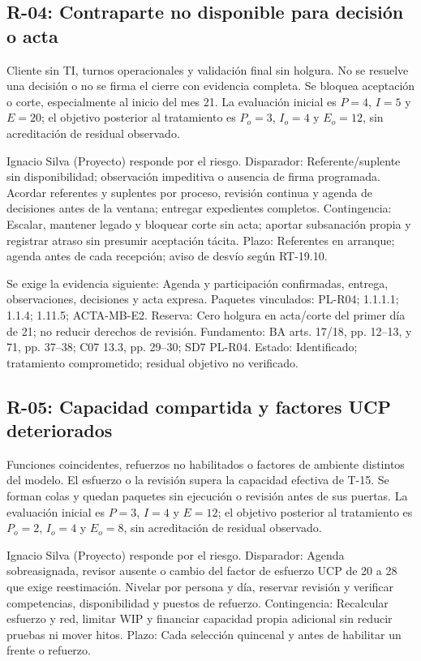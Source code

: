 \subsection{R-04: Contraparte no disponible para decisión o acta}
Cliente sin TI, turnos operacionales y validación final sin holgura. No se resuelve una decisión o no se firma el cierre con evidencia completa. Se bloquea aceptación o corte, especialmente al inicio del mes 21. La evaluación inicial es $P=4$, $I=5$ y $E=20$; el objetivo posterior al tratamiento es $P_o=3$, $I_o=4$ y $E_o=12$, sin acreditación de residual observado.

Ignacio Silva (Proyecto) responde por el riesgo. Disparador: Referente/suplente sin disponibilidad; observación impeditiva o ausencia de firma programada. Acordar referentes y suplentes por proceso, revisión continua y agenda de decisiones antes de la ventana; entregar expedientes completos. Contingencia: Escalar, mantener legado y bloquear corte sin acta; aportar subsanación propia y registrar atraso sin presumir aceptación tácita. Plazo: Referentes en arranque; agenda antes de cada recepción; aviso de desvío según RT-19.10.

Se exige la evidencia siguiente: Agenda y participación confirmadas, entrega, observaciones, decisiones y acta expresa. Paquetes vinculados: PL-R04; 1.1.1.1; 1.1.4; 1.11.5; ACTA-MB-E2. Reserva: Cero holgura en acta/corte del primer día de 21; no reducir derechos de revisión. Fundamento: BA arts. 17/18, pp. 12–13, y 71, pp. 37–38; C07 13.3, pp. 29–30; SD7 PL-R04. Estado: Identificado; tratamiento comprometido; residual objetivo no verificado. \parencites[arts.~17/18, pp.~12--13; art.~71, pp.~37--38]{sd8-ba}[numeral 13.3, pp.~29--30]{sd8-c07}

\subsection{R-05: Capacidad compartida y factores UCP deteriorados}
Funciones coincidentes, refuerzos no habilitados o factores de ambiente distintos del modelo. El esfuerzo o la revisión supera la capacidad efectiva de T-15. Se forman colas y quedan paquetes sin ejecución o revisión antes de sus puertas. La evaluación inicial es $P=3$, $I=4$ y $E=12$; el objetivo posterior al tratamiento es $P_o=2$, $I_o=4$ y $E_o=8$, sin acreditación de residual observado.

Ignacio Silva (Proyecto) responde por el riesgo. Disparador: Agenda sobreasignada, revisor ausente o cambio del factor de esfuerzo UCP de 20 a 28 que exige reestimación. Nivelar por persona y día, reservar revisión y verificar competencias, disponibilidad y puestos de refuerzo. Contingencia: Recalcular esfuerzo y red, limitar WIP y financiar capacidad propia adicional sin reducir pruebas ni mover hitos. Plazo: Cada selección quincenal y antes de habilitar un frente o refuerzo.

